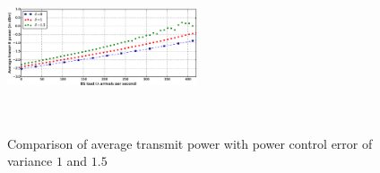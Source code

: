 \begin{figure}[!tb]
	\centering
	\includegraphics[width=0.5\textwidth,height=5cm]{Chapter3/Figures/Imperfect-power-control-CDMA-delta2-2015-1003}
	\caption{Comparison of average transmit power with power control error of variance $1$ and $1.5$ }
	\label{fig:imperfect-power-control-delta2}
\end{figure}